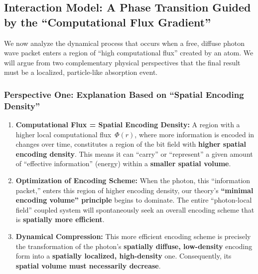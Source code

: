 \documentclass[11pt, a4paper]{article}
\begin{document}
\subsection{Interaction Model: A Phase Transition Guided by the ``Computational Flux Gradient''}

We now analyze the dynamical process that occurs when a free, diffuse photon wave packet enters a region of ``high computational flux'' created by an atom. We will argue from two complementary physical perspectives that the final result must be a localized, particle-like absorption event.

\subsubsection{Perspective One: Explanation Based on ``Spatial Encoding Density''}
\begin{enumerate}
    \item \textbf{Computational Flux = Spatial Encoding Density:} A region with a higher local computational flux~$\Phi(r)$, where more information is encoded in changes over time, constitutes a region of the bit field with \textbf{higher spatial encoding density}. This means it can ``carry'' or ``represent'' a given amount of ``effective information'' (energy) within a \textbf{smaller spatial volume}.
    \item \textbf{Optimization of Encoding Scheme:} When the photon, this ``information packet,'' enters this region of higher encoding density, our theory's \textbf{``minimal encoding volume'' principle} begins to dominate. The entire ``photon-local field'' coupled system will spontaneously seek an overall encoding scheme that is \textbf{spatially more efficient}.
    \item \textbf{Dynamical Compression:} This more efficient encoding scheme is precisely the transformation of the photon's \textbf{spatially diffuse, low-density} encoding form into a \textbf{spatially localized, high-density} one. Consequently, its \textbf{spatial volume must necessarily decrease}.
\end{enumerate}
\end{document}
